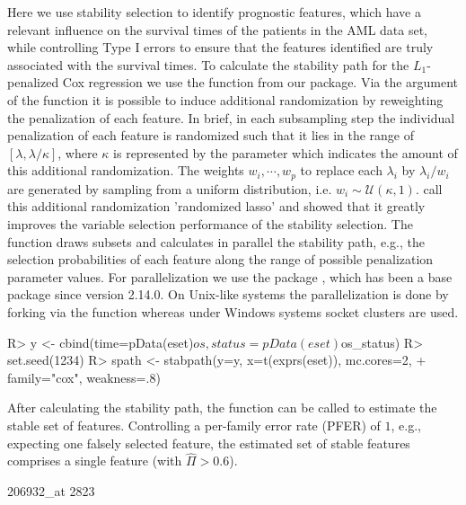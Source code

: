\documentclass[]{jss}
\begin{document}
Here we use stability selection to identify prognostic features, which have a relevant influence on the survival times of the patients in the AML data set, while controlling Type I errors to ensure that the features identified are truly associated with the survival times.
To calculate the stability path for the $L_1$-penalized Cox regression we use the function  from our  package. Via the  argument of the function  it is possible to induce additional randomization by reweighting the penalization of each feature. In brief, in each subsampling step the individual penalization of each feature is randomized such that it lies in the range of $[\lambda,\lambda/\kappa]$, where $\kappa$ is represented by the  parameter which indicates the amount of this additional randomization. The weights $w_{i},\cdots,w_{p}$ to replace each $\lambda_{i}$ by $\lambda_{i}/w_{i}$ are generated by sampling from a uniform distribution, i.e. $w_{i} \sim \mathcal{U}(\kappa,1)$. \citet{MeinshausenBuehlmann2010} call this additional randomization 'randomized lasso' and showed that it greatly improves the variable selection performance of the stability selection. The function  draws subsets and calculates in parallel the stability path, e.g., the selection probabilities of each feature along the range of possible penalization parameter values. For parallelization we use the package , which has been a base package since  version 2.14.0. On Unix-like systems the parallelization is done by forking via the function  whereas under Windows systems socket clusters are used. 

\begin{Schunk}
\begin{Sinput}
R> y <- cbind(time=pData(eset)$os, status=pData(eset)$os_status)
R> set.seed(1234)
R> spath <- stabpath(y=y, x=t(exprs(eset)), mc.cores=2,
+                          family="cox", weakness=.8)
\end{Sinput}
\end{Schunk}


After calculating the stability path, the function  can be called to estimate the stable set of features. Controlling a per-family error rate (PFER) of $1$, e.g., expecting one falsely selected feature, the estimated set of stable features comprises a single feature (with $\hat\Pi>0.6$).

\begin{Schunk}
\begin{Soutput}
206932_at 
     2823 
\end{Soutput}
\end{Schunk}
\end{document}
